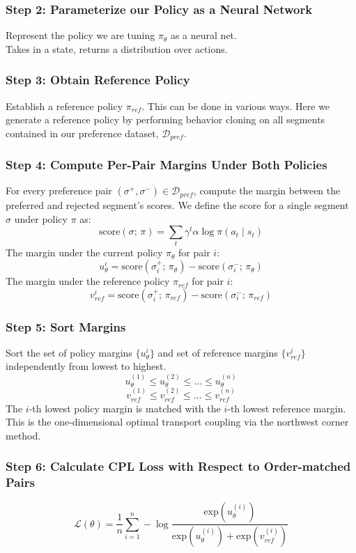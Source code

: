 \documentclass[11pt]{article}
\begin{document}
\subsubsection*{Step 2: Parameterize our Policy as a Neural Network}
Represent the policy we are tuning $\pi_\theta$ as a neural net.\\
Takes in a state, returns a distribution over actions.

\subsubsection*{Step 3: Obtain Reference Policy}
Establish a reference policy $\pi_{ref}$. This can be done in various ways. Here we generate a reference policy by performing behavior cloning on all segments contained in our preference dataset, $\mathcal{D}_{pref}$.

\subsubsection*{Step 4: Compute Per-Pair Margins Under Both Policies}
For every preference pair $(\sigma^+,\sigma^-)\in\mathcal{D}_{pref}$, compute the margin between the preferred and rejected segment's scores. We define the score for a single segment $\sigma$ under policy $\pi$ as:
$$\text{score}(\sigma;\,\pi)=\sum_{t} \gamma^t \alpha \log \pi(a_t \mid s_t)$$
The margin under the current policy $\pi_{\theta}$ for pair $i$:
$$u_\theta^i = \text{score}(\sigma_i^+;\,\pi_\theta) - \text{score}(\sigma_i^-;\,\pi_\theta)$$
The margin under the reference policy $\pi_{ref}$ for pair $i$:
$$v_{ref}^i = \text{score}(\sigma_i^+;\,\pi_{ref}) - \text{score}(\sigma_i^-;\,\pi_{ref})$$

\subsubsection*{Step 5: Sort Margins}
Sort the set of policy margins $\{u_\theta^i\}$ and set of reference margins $\{v_{ref}^i\}$ independently from lowest to highest.
$$u_\theta^{(1)} \leq u_\theta^{(2)} \leq \ldots \leq u_\theta^{(n)}$$
$$v_{ref}^{(1)} \leq v_{ref}^{(2)} \leq \ldots \leq v_{ref}^{(n)}$$
The $i$-th lowest policy margin is matched with the $i$-th lowest reference margin. This is the one-dimensional optimal transport coupling via the northwest corner method.

\subsubsection*{Step 6: Calculate CPL Loss with Respect to Order-matched Pairs}
$$\mathcal{L}(\theta)=\frac{1}{n}\sum_{i=1}^{n}-\log \frac{\text{exp}(u_\theta^{(i)})}{\text{exp}(u_\theta^{(i)})+\text{exp}(v_{ref}^{(i)})}$$
\end{document}
